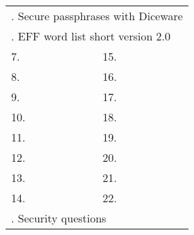 \newpage

\changepage{}{.3in}{-.15in}{-.15in}{}{}{}{}{}

\newcommand{\myrule}{
	\hdashrule{1.35in}{0.5pt}{1.25pt}
}
\newcommand{\myrulespace}{
	\vspace{.24in}
}

\Large
\begin{center}
		

\vspace*{\fill}

\setlength{\tabcolsep}{1pt}
\begin{tabular}{l l l l }
	\multicolumn{4}{l}{\pageref{ch:diceware}. Secure passphrases with Diceware} \vspace{.15in} \\
	\multicolumn{4}{l}{\pageref{ch:wordlist}. EFF word list short version 2.0} \vspace{.15in} \\
	7. & \myrule & 15. & \myrule \myrulespace \\
	8. & \myrule & 16. & \myrule \myrulespace \\
	9. & \myrule & 17. & \myrule \myrulespace \\
	10. & \myrule & 18. & \myrule \myrulespace \\
	11. & \myrule & 19. & \myrule \myrulespace \\
	12. & \myrule & 20. & \myrule \myrulespace \\
	13. & \myrule & 21. & \myrule \myrulespace \\
	14. & \myrule & 22. & \myrule \vspace{.15in} \\
	\multicolumn{4}{l}{\pageref{ch:qna}. Security questions} \\
\end{tabular}

\end{center}

\vspace*{\fill}

\newpage
\small
\changepage{}{-.3in}{.15in}{.15in}{}{}{}{}{}
